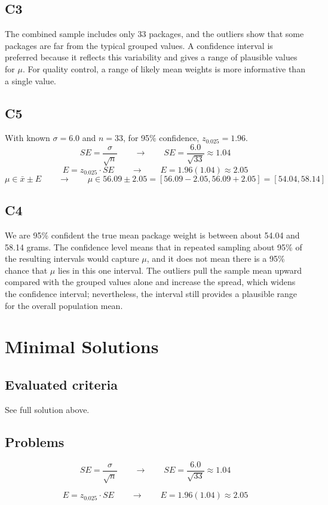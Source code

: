 \begin{ExamProblems}
		\subsection*{C3}
		The combined sample includes only 33 packages, and the outliers show that some packages are far from the typical grouped values. A confidence interval is preferred because it reflects this variability and gives a range of plausible values for $\mu$. For quality control, a range of likely mean weights is more informative than a single value.

		\subsection*{C5}
		With known $\sigma = 6.0$ and $n=33$, for 95\% confidence, $z_{0.025}=1.96$.
		\[
		SE = \frac{\sigma}{\sqrt{n}} \qquad \longrightarrow \qquad SE = \frac{6.0}{\sqrt{33}} \approx 1.04
		\]
		\[
		E = z_{0.025} \cdot SE \qquad \longrightarrow \qquad E = 1.96(1.04) \approx 2.05
		\]
		\[
		\mu \in \bar{x} \pm E \qquad \longrightarrow \qquad \mu \in 56.09 \pm 2.05 = [56.09 - 2.05, 56.09 + 2.05] = [54.04, 58.14]
		\]

		\subsection*{C4}
		We are 95\% confident the true mean package weight is between about 54.04 and 58.14 grams. The confidence level means that in repeated sampling about 95\% of the resulting intervals would capture $\mu$, and it does not mean there is a 95\% chance that $\mu$ lies in this one interval. The outliers pull the sample mean upward compared with the grouped values alone and increase the spread, which widens the confidence interval; nevertheless, the interval still provides a plausible range for the overall population mean.
	\end{ExamProblems}


\section{Minimal Solutions}

\subsection*{Evaluated criteria}
See full solution above.

\subsection*{Problems}
\[SE = \frac{\sigma}{\sqrt{n}} \qquad \longrightarrow \qquad SE = \frac{6.0}{\sqrt{33}} \approx 1.04\]

\[E = z_{0.025} \cdot SE \qquad \longrightarrow \qquad E = 1.96(1.04) \approx 2.05\]



